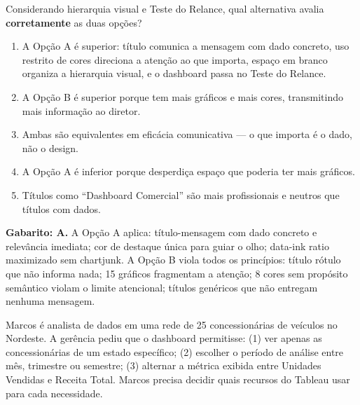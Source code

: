 \begin{SolvedBox}[title=Questão 2 --- Prova II Unidade (2{,}0 pts) --- Design de Dashboard]
Considerando hierarquia visual e Teste do Relance, qual alternativa avalia \textbf{corretamente} as duas opções?
\begin{enumerate}[label=\Alph*)]
  \item A Opção A é superior: título comunica a mensagem com dado concreto, uso restrito de cores direciona a atenção ao que importa, espaço em branco organiza a hierarquia visual, e o dashboard passa no Teste do Relance.
  \item A Opção B é superior porque tem mais gráficos e mais cores, transmitindo mais informação ao diretor.
  \item Ambas são equivalentes em eficácia comunicativa --- o que importa é o dado, não o design.
  \item A Opção A é inferior porque desperdiça espaço que poderia ter mais gráficos.
  \item Títulos como ``Dashboard Comercial'' são mais profissionais e neutros que títulos com dados.
\end{enumerate}
\end{SolvedBox}

\textbf{Gabarito: A.} A Opção A aplica: título-mensagem com dado concreto e relevância imediata; cor de destaque única para guiar o olho; data-ink ratio maximizado sem chartjunk. A Opção B viola todos os princípios: título rótulo que não informa nada; 15 gráficos fragmentam a atenção; 8 cores sem propósito semântico violam o limite atencional; títulos genéricos que não entregam nenhuma mensagem.

\medskip

Marcos é analista de dados em uma rede de 25 concessionárias de veículos no Nordeste. A gerência pediu que o dashboard permitisse: (1) ver apenas as concessionárias de um estado específico; (2) escolher o período de análise entre mês, trimestre ou semestre; (3) alternar a métrica exibida entre Unidades Vendidas e Receita Total. Marcos precisa decidir quais recursos do Tableau usar para cada necessidade.

